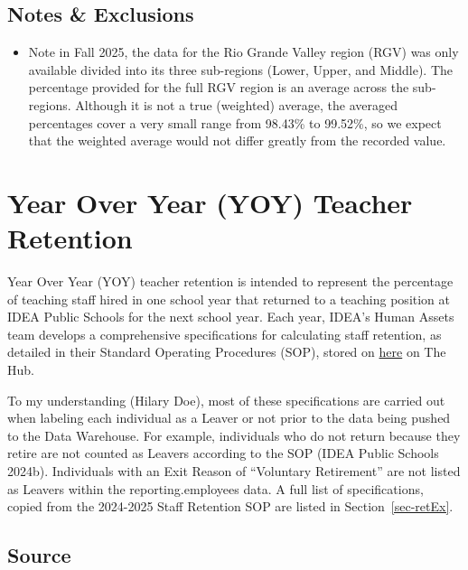 \documentclass[
  letterpaper,
  DIV=11,
  numbers=noendperiod]{scrreprt}
\providecommand{\tightlist}{%
  \setlength{\itemsep}{0pt}\setlength{\parskip}{0pt}}
\begin{document}
\subsection{Notes \& Exclusions}\label{notes-exclusions-2}

\begin{itemize}
\tightlist
\item
  Note in Fall 2025, the data for the Rio Grande Valley region (RGV) was
  only available divided into its three sub-regions (Lower, Upper, and
  Middle). The percentage provided for the full RGV region is an average
  across the sub-regions. Although it is not a true (weighted) average,
  the averaged percentages cover a very small range from 98.43\% to
  99.52\%, so we expect that the weighted average would not differ
  greatly from the recorded value.
\end{itemize}

\section{Year Over Year (YOY) Teacher Retention}\label{sec-YOYTeach}

Year Over Year (YOY) teacher retention is intended to represent the
percentage of teaching staff hired in one school year that returned to a
teaching position at IDEA Public Schools for the next school year. Each
year, IDEA's Human Assets team develops a comprehensive specifications
for calculating staff retention, as detailed in their Standard Operating
Procedures (SOP), stored on
\href{https://ideapublicschoolsorg.sharepoint.com/:u:/r/HumanAssets/SitePages/Retention-Policy.aspx?csf=1&web=1&e=6ODfpp}{here}
on The Hub.

To my understanding (Hilary Doe), most of these specifications are
carried out when labeling each individual as a Leaver or not prior to
the data being pushed to the Data Warehouse. For example, individuals
who do not return because they retire are not counted as Leavers
according to the SOP (IDEA Public Schools 2024b). Individuals with an
Exit Reason of ``Voluntary Retirement'' are not listed as Leavers within
the reporting.employees data. A full list of specifications, copied from
the 2024-2025 Staff Retention SOP are listed in Section~\ref{sec-retEx}.

\subsection{Source}\label{source-5}
\end{document}
